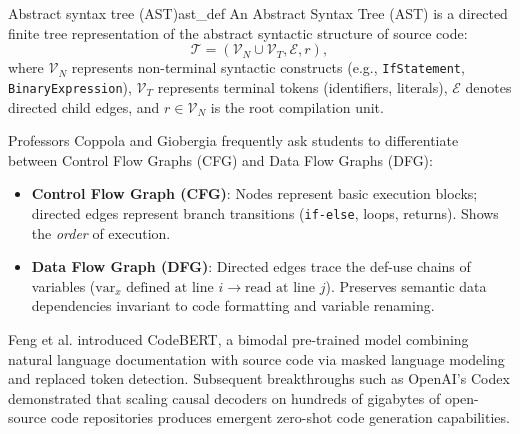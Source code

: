 \documentclass[../../main.tex]{subfiles}
\begin{document}
\begin{definition}{Abstract syntax tree (AST)}{ast_def}
An Abstract Syntax Tree (AST) is a directed finite tree representation of the abstract syntactic structure of source code:
\begin{equation}
\mathcal{T} = (\mathcal{V}_N \cup \mathcal{V}_T, \mathcal{E}, r),
\end{equation}
where $\mathcal{V}_N$ represents non-terminal syntactic constructs (e.g., \texttt{IfStatement}, \texttt{BinaryExpression}), $\mathcal{V}_T$ represents terminal tokens (identifiers, literals), $\mathcal{E}$ denotes directed child edges, and $r \in \mathcal{V}_N$ is the root compilation unit.
\end{definition}

\begin{examinsight}
Professors Coppola and Giobergia frequently ask students to differentiate between Control Flow Graphs (CFG) and Data Flow Graphs (DFG):
\begin{itemize}
    \item \textbf{Control Flow Graph (CFG)}: Nodes represent basic execution blocks; directed edges represent branch transitions (\texttt{if-else}, loops, returns). Shows the \emph{order} of execution.
    \item \textbf{Data Flow Graph (DFG)}: Directed edges trace the def-use chains of variables ($\text{var}_x \text{ defined at line } i \to \text{read at line } j$). Preserves semantic data dependencies invariant to code formatting and variable renaming.
\end{itemize}
\end{examinsight}

\begin{deepdive}
Feng et al. \citep{feng2020codebert} introduced CodeBERT, a bimodal pre-trained model combining natural language documentation with source code via masked language modeling and replaced token detection. Subsequent breakthroughs such as OpenAI's Codex \citep{chen2021codex} demonstrated that scaling causal decoders on hundreds of gigabytes of open-source code repositories produces emergent zero-shot code generation capabilities.
\end{deepdive}
\end{document}

